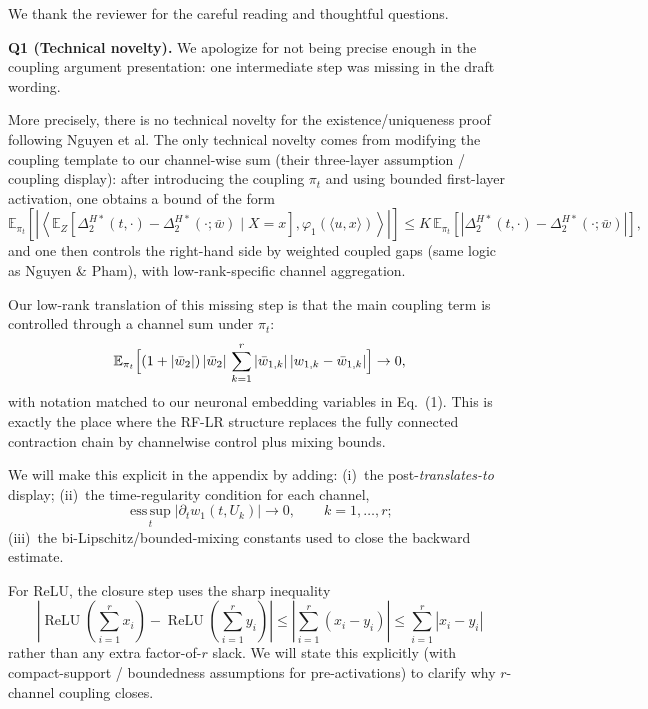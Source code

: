 We thank the reviewer for the careful reading and thoughtful questions.

\medskip
\noindent\textbf{Q1 (Technical novelty).}\quad
We apologize for not being precise enough in the coupling argument presentation: one intermediate step was missing in the draft wording.

More precisely, there is no technical novelty for the existence/uniqueness proof following Nguyen et al.
The only technical novelty comes from modifying the coupling template to our channel-wise sum (their three-layer assumption / coupling display): after introducing the coupling $\pi_t$ and using bounded first-layer activation, one obtains a bound of the form
$$
\mathbb{E}_{\pi_t}\left[\left|\left\langle \mathbb{E}_{Z}\left[ \Delta_{2}^{H*}(t,\cdot)-\Delta_{2}^{H*}(\cdot;\bar w)\mid X=x \right],\varphi_{1}(\langle u,x\rangle) \right\rangle\right|\right]
\le K\,\mathbb{E}_{\pi_t}\left[\left|\Delta_{2}^{H*}(t,\cdot)-\Delta_{2}^{H*}(\cdot;\bar w)\right|\right],
$$
and one then controls the right-hand side by weighted coupled gaps (same logic as Nguyen \& Pham), with low-rank-specific channel aggregation.

Our low-rank translation of this missing step is that the main coupling term is controlled through a channel sum under $\pi_t$:
$$
\mathbb{E}_{\pi_t}\Bigl[(1+|\bar w_2|)\,|\bar w_2|\,\sum_{k=1}^{r} |\bar w_{1,k}|\,|w_{1,k}-\bar w_{1,k}|\Bigr]\to 0,
$$
with notation matched to our neuronal embedding variables in Eq.~(1).
This is exactly the place where the RF-LR structure replaces the fully connected contraction chain by channelwise control plus mixing bounds.

We will make this explicit in the appendix by adding:
(i)~the post-\emph{translates-to} display;
(ii)~the time-regularity condition for each channel,
$$
\operatorname*{ess\,sup}_{t}\left|\partial_t w_1(t,U_k)\right|\to 0,\qquad k=1,\dots,r;
$$
(iii)~the bi-Lipschitz/bounded-mixing constants used to close the backward estimate.

For ReLU, the closure step uses the sharp inequality
$$
\left|\operatorname{ReLU}\left(\sum_{i=1}^{r}x_i\right)-\operatorname{ReLU}\left(\sum_{i=1}^{r}y_i\right)\right|
\le \left|\sum_{i=1}^{r}(x_i-y_i)\right|
\le \sum_{i=1}^{r}|x_i-y_i|
$$
rather than any extra factor-of-$r$ slack.
We will state this explicitly (with compact-support / boundedness assumptions for pre-activations) to clarify why $r$-channel coupling closes.

